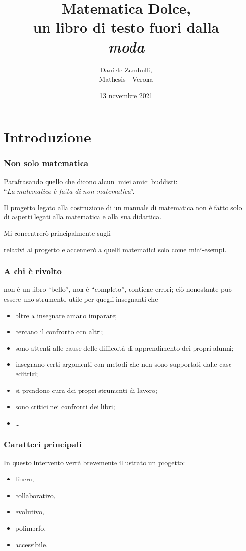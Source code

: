 \documentclass{beamer} %
\title{Matematica Dolce,\\ 
un libro di testo fuori dalla \\
\emph{moda}}
\date{13 novembre 2021\\[2em] 
\scalebox{.5}{\texttt{[image: by-sa.png]}}}
\author{Daniele Zambelli, \\
Mathesis - Verona
}
\begin{document}
\initslides

\section{Introduzione}

\begin{frame}\frametitle{Non solo matematica}

\begin{flushright}
Parafrasando quello che dicono alcuni miei amici buddisti: \\
``\emph{La matematica è fatta di non matematica}''.
\end{flushright}

Il progetto legato alla costruzione di un manuale di matematica non è 
fatto solo di aspetti legati alla matematica e alla sua didattica. 

\bigskip
\pause
Mi concentrerò principalmente sugli 
\begin{center} \end{center}
relativi al progetto  e accennerò a quelli 
matematici solo come mini-esempi.

\end{frame}


\begin{frame}\frametitle{A chi è rivolto}

\md non è un libro ``bello'', non è ``completo'', contiene errori;
ciò nonostante può essere uno strumento utile per quegli insegnanti che

\bigskip
\begin{itemize} [<+->]
\item oltre a insegnare amano imparare;
\item cercano il confronto con altri;
\item sono attenti alle cause delle difficoltà di apprendimento dei propri 
alunni;
\item insegnano certi argomenti con metodi che non sono supportati dalle case 
editrici;
\item si prendono cura dei propri strumenti di lavoro;
\item sono critici nei confronti dei libri;
\item \dots
\end{itemize}

\end{frame}


\begin{frame}\frametitle{Caratteri principali}

In questo intervento verrà brevemente illustrato un progetto:

\bigskip
\begin{itemize}  %
\item libero,
\item collaborativo,
\item evolutivo,
\item polimorfo,
\item accessibile.
\end{itemize}

\end{frame}
\end{document}
